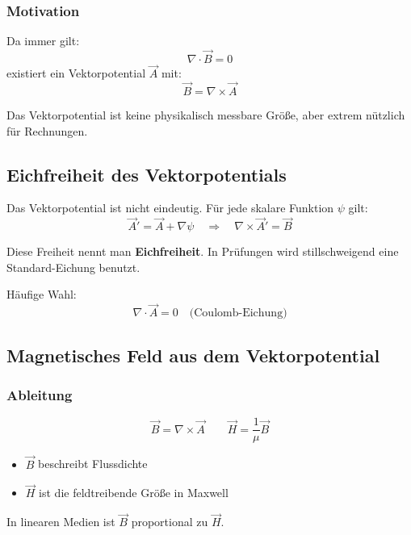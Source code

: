 \documentclass[a4paper]{article}
\newcommand{\imp}[1]{{\color{accent}\bfseries #1}}
\newcommand{\Hf}{\vec H}
\newcommand{\B}{\vec B}
\newcommand{\A}{\vec A}
\begin{document}
\subsubsection{Motivation}

Da immer gilt:
\[
\nabla \cdot \B = 0
\]
existiert ein Vektorpotential $\A$ mit:
\[
\B = \nabla \times \A
\]

\begin{merke}
Das Vektorpotential ist keine physikalisch messbare Größe,
aber extrem nützlich für Rechnungen.
\end{merke}

\subsection{Eichfreiheit des Vektorpotentials}

Das Vektorpotential ist nicht eindeutig.
Für jede skalare Funktion $\psi$ gilt:
\[
\A' = \A + \nabla \psi
\quad \Rightarrow \quad
\nabla \times \A' = \B
\]

\begin{schema}
Diese Freiheit nennt man \imp{Eichfreiheit}.
In Prüfungen wird stillschweigend eine Standard-Eichung benutzt.
\end{schema}

Häufige Wahl:
\[
\nabla \cdot \A = 0
\quad \text{(Coulomb-Eichung)}
\]

\subsection{Magnetisches Feld aus dem Vektorpotential}

\subsubsection{Ableitung}

\[
\B = \nabla \times \A
\qquad
\Hf = \frac{1}{\mu}\B
\]

\begin{itemize}
  \item $\B$ beschreibt Flussdichte
  \item $\Hf$ ist die feldtreibende Größe in Maxwell
\end{itemize}

\begin{checkitem}
In linearen Medien ist $\B$ proportional zu $\Hf$.
\end{checkitem}
\end{document}
